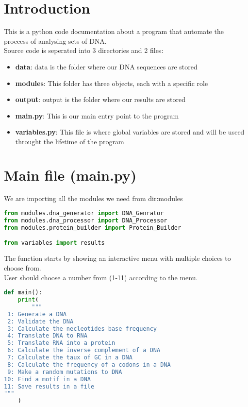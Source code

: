 \documentclass[11pt]{article}
\begin{document}
\section{Introduction}
This is a python code documentation about a program that automate the proccess of analysing sets of DNA.\\
Source code is seperated into 3 directories and 2 files:
\begin{itemize}
\item{\textbf{data}: data is the folder where our DNA sequences are stored}
\item{\textbf{modules}: This folder has three objects, each with a specific role}
\item{\textbf{output}: output is the folder where our results are stored}
\item{\textbf{main.py}: This is our main entry point to the program}
\item{\textbf{variables.py}: This file is where global variables are stored and will be useed throught the lifetime of the program}
\end{itemize}

\section{Main file (main.py)}
We are importing all the modules we need from dir:modules
\begin{lstlisting}[language=Python, style=PythonStyle]
from modules.dna_generator import DNA_Genrator
from modules.dna_processor import DNA_Processor
from modules.protein_builder import Protein_Builder

from variables import results
\end{lstlisting}
The function starts by showing an interactive menu with multiple choices to choose from.\\
User should choose a number from (1-11) according to the menu.
\begin{lstlisting}[language=Python, style=PythonStyle]
def main():
    print(
        """
 1: Generate a DNA
 2: Validate the DNA
 3: Calculate the necleotides base frequency
 4: Translate DNA to RNA
 5: Translate RNA into a protein
 6: Calculate the inverse complement of a DNA
 7: Calculate the taux of GC in a DNA
 8: Calculate the frequency of a codons in a DNA
 9: Make a random mutations to DNA
10: Find a motif in a DNA
11: Save results in a file
"""
    )
\end{lstlisting}
\end{document}
